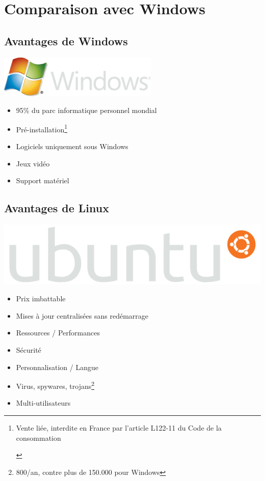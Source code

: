 \documentclass{beamer}
\begin{document}
\section{Comparaison avec Windows}
\subsection{Avantages de Windows}
\begin{frame} 
  \begin{flushright}
      \includegraphics[width=0.3\linewidth]{images/Windows_logo}
  \end{flushright}
  \begin{itemize}
  \item 95\% du parc informatique personnel mondial
  \item Pr\'e-installation\footnote{ \begin{scriptsize}Vente liée, interdite en France par l'article L122-11 du Code de la consommation\end{scriptsize}}
  \item Logiciels uniquement sous Windows
  \item Jeux vid\'eo
  \item Support mat\'eriel
  \end{itemize}
\end{frame}

\subsection{Avantages de Linux}
\begin{frame} 
  \begin{flushright}
      \includegraphics[width=0.3\linewidth]{images/Ubuntu_logo}
  \end{flushright}
  \begin{itemize}
  \item Prix imbattable
  \item Mises \`a jour centralis\'ees sans red\'emarrage
  \item Ressources / Performances
  \item S\'ecurit\'e
  \item Personnalisation / Langue
  \item Virus, spywares, trojans\footnote{{\scriptsize 800/an, contre plus de 150.000 pour Windows}}
  \item Multi-utilisateurs
  \end{itemize}
\end{frame}
\end{document}
